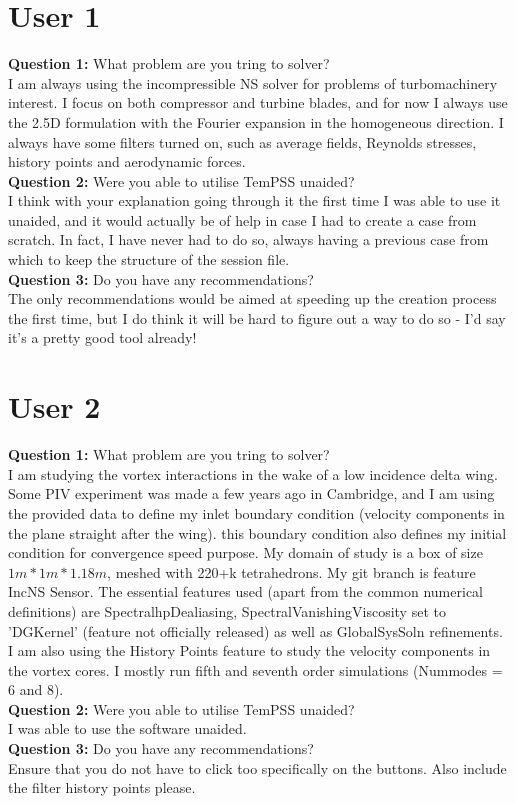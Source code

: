 \documentclass[11pt, a4paper]{report}
\begin{document}
\section{User 1}
\textbf{Question 1:} What problem are you tring to solver?\\
I am always using the incompressible NS solver for problems of turbomachinery interest. I focus on both compressor and turbine blades, and for now I always use the 2.5D formulation with the Fourier expansion in the homogeneous direction. I always have some filters turned on, such as average fields, Reynolds stresses, history points and aerodynamic forces.\\
\textbf{Question 2:} Were you able to utilise TemPSS unaided?\\
I think with your explanation going through it the first time I was able to use it unaided, and it would actually be of help in case I had to create a case from scratch. In fact, I have never had to do so, always having a previous case from which to keep the structure of the session file.\\
\textbf{Question 3:} Do you have any recommendations?\\
The only recommendations would be aimed at speeding up the creation process the first time, but I do think it will be hard to figure out a way to do so - I'd say it's a pretty good tool already!

\section{User 2}
\textbf{Question 1:} What problem are you tring to solver?\\
I am studying the vortex interactions in the wake of a low incidence delta wing. Some PIV experiment was made a few years ago in Cambridge, and I am using the provided data to define my inlet boundary condition (velocity components in the plane straight after the wing). this boundary condition also defines my initial condition for convergence speed purpose. My domain of study is a box of size $1m*1m*1.18m$, meshed with 220+k tetrahedrons. My git branch is feature IncNS Sensor. The essential features used (apart from the common numerical definitions) are SpectralhpDealiasing, SpectralVanishingViscosity set to 'DGKernel' (feature not officially released) as well as GlobalSysSoln refinements. I am also using the History Points feature to study the velocity components in the vortex cores. I mostly run fifth and seventh order simulations (Nummodes = 6 and 8).\\
\textbf{Question 2:} Were you able to utilise TemPSS unaided?\\
I was able to use the software unaided.\\
\textbf{Question 3:} Do you have any recommendations?\\
Ensure that you do not have to click too specifically on the buttons. Also include the filter history points please.
\end{document}
